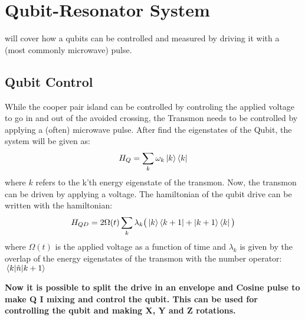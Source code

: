 \chapter{Qubit-Resonator System}\label{sec:qubit-resonator}
 will cover how a qubits can be controlled and measured by driving it with a (most commonly microwave) pulse. 


\section{Qubit Control}
While the cooper pair island can be controlled by controling the applied voltage to go in and out of the avoided crossing, the Transmon needs to be controlled by applying a (often) microwave pulse. After find the eigenstates of the Qubit, the system will be given as:
\begin{equation}
    H_Q = \sum_k \omega_k \ket{k}\bra{k}
\end{equation}
where $k$ refers to the k'th energy eigenstate of the transmon. Now, the transmon can be driven by applying a voltage. The hamiltonian of the qubit drive can be written with the hamiltonian:
\begin{equation}
    H_{QD} = 2 \Omega(t) \sum_k \lambda_k \big(\ket{k}\bra{k + 1} + \ket{k + 1}\bra{k} \big)
\end{equation}
where $\Omega(t)$ is the applied voltage as a function of time and $\lambda_k$ is given by the overlap of the energy eigenstates of the transmon with the number operator: $\matrixel{k}{\hat{n}}{k+1}$ 

\textbf{Now it is possible to split the drive in an envelope and Cosine pulse to make Q I mixing and control the qubit. This can be used for controlling the qubit and making X, Y and Z rotations.}

